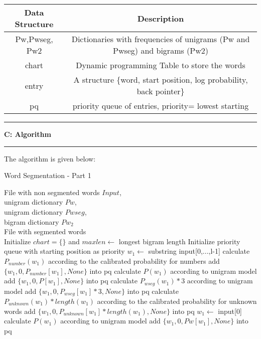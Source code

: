 \documentclass[11pt]{article}
\newcommand\question[2]{\vspace{.25in}\hrule\textbf{#1: #2}\vspace{.5em}\hrule\vspace{.10in}}
\begin{document}
\begin{table}[h]
	\vspace{-4pt}
	\centering
	\renewcommand\arraystretch{1.25}
	\begin{tabular}{|c|c|}
		\hline
		Data Structure   & Description  \\
		\hline
		Pw,Pwseg, Pw2 & Dictionaries with frequencies of unigrams (Pw and Pwseg) and bigrams (Pw2) \\
		\hline
		chart &Dynamic programming Table to store the words\\
		\hline
		entry & A structure \{word, start position, log probability, back pointer\}  \\
		\hline
		pq & priority queue of entries, priority= lowest starting   \\
		\hline
	\end{tabular}
	\vspace{-6pt}
\end{table}

\question{C}{Algorithm} 

The algorithm is given below:		

\begin{algorithm}[htb]
	\renewcommand{\algorithmicrequire}{\textbf{Input:}\hspace{10.7pt}}
	\renewcommand\algorithmicensure {\textbf{Output:} }
	\caption{Word Segmentation - Part 1}
	\label{alg:pbg}
	\begin{algorithmic}[1]
		\REQUIRE File with non segmented words $Input$,\\
		unigram dictionary $Pw$,\\
		unigram dictionary $Pwseg$,\\
		bigram dictionary $Pw_2$\\ 
		\ENSURE File with segmented words \\
		\vspace{3pt}
		\STATE Initialize $chart=\{\}$ and $maxlen \gets $ longest bigram length
		\STATE Initialize priority queue with starting position as priority
		\STATE $w_1 \gets$ substring input[0,...,l-1]
		\STATE calculate $P_{number}(w_1)$ according to the calibrated probability for numbers
		\STATE add $\{w_1,0,P_{number}[w_1],None\}$ into pq
		\STATE calculate $P(w_1)$ according to unigram model 
		\STATE add $\{w_1,0,P[w_1],None\}$ into pq
		\STATE {}
		\STATE calculate $P_{wseg}(w_1) * 3$ according to unigram model 
		\STATE add $\{w_1,0,P_{wseg}[w_1] * 3,None\}$ into pq
		\ELSE
		\STATE {}
		\STATE calculate $P_{unknown}(w_1) * length(w_1)$ according to the calibrated probability for unknown words 
		\STATE add $\{w_1,0,P_{unknown}[w_1] * length(w_1),None\}$ into pq		
		\ENDIF
		\ENDFOR
		\STATE $w_1 \gets$ input[0]
		\STATE calculate $P(w_1)$ according to unigram model  
		\STATE add $\{w_1,0,Pw[w_1],None\}$ into pq
		\ENDIF
	\end{algorithmic}
\end{algorithm}
\end{document}

